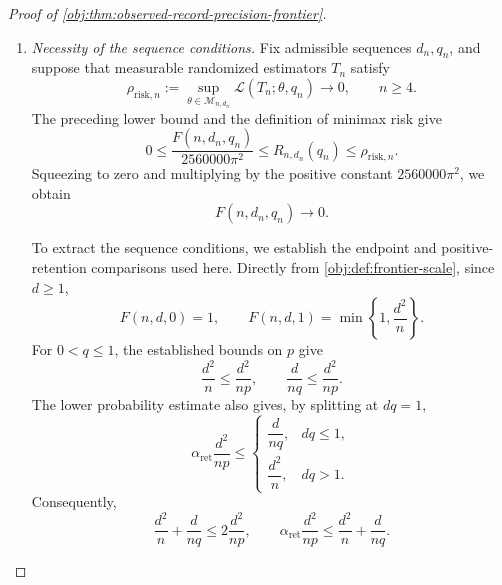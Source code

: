 \documentclass[11pt]{article}
\begin{document}
\begin{proof}[Proof of \cref{obj:thm:observed-record-precision-frontier}]
\begin{enumerate}
Take the opposite-sign priors of \cref{obj:def:block-prior} at amplitude \(h\).
By \cref{obj:lem:block-law}, they are supported almost surely in
\(\mathcal M_{n,d}\), with constant targets \(\pm\Delta\), where
\[
\Delta=\frac{mh}{n}>0.
\]
The record maps are jointly measurable: the partition and binary coordinates
are finite, and the outcomes depend affinely on the real baseline coordinates.
The block and amplitude conditions established above allow
\cref{obj:thm:block-testing-scale} to give
\[
\operatorname{TV}(P_{+1,h},P_{-1,h})\le\frac12.
\]
Applying \cref{obj:lem:full-record-two-prior-risk} therefore yields
\[
R_{n,d}(q)
\ge\frac{\Delta^2}{2}
       \bigl(1-\operatorname{TV}(P_{+1,h},P_{-1,h})\bigr)
\ge\frac{\Delta^2}{4}.
\]
Finally, \(m/n\ge1/4\) implies
\[
\frac{\kappa s}{4}
\le\frac{m\kappa s}{n}
=\Delta.
\]
Hence
\[
\begin{aligned}
\frac{F(n,d,q)}{2560000\pi^2}
&\le\frac{s^2}{2560000\pi^2}
\le\frac{s^2}{640000\pi^2}\\
&=\frac14\left(\frac{\kappa s}{4}\right)^2
\le\frac{\Delta^2}{4}
\le R_{n,d}(q).
\end{aligned}
\]
This proves the lower bound in both degree regimes, including \(q=0\).

\item \textit{Necessity of the sequence conditions.}
Fix admissible sequences \(d_n,q_n\), and suppose that measurable randomized
estimators \(T_n\) satisfy
\[
\rho_{\mathrm{risk},n}
:=
\sup_{\theta\in\mathcal M_{n,d_n}}
\mathcal L(T_n;\theta,q_n)
\longrightarrow0,
\qquad n\ge4.
\]
The preceding lower bound and the definition of minimax risk give
\[
0\le
\frac{F(n,d_n,q_n)}{2560000\pi^2}
\le R_{n,d_n}(q_n)
\le\rho_{\mathrm{risk},n}.
\]
Squeezing to zero and multiplying by the positive constant
\(2560000\pi^2\), we obtain
\[
F(n,d_n,q_n)\longrightarrow0.
\]

To extract the sequence conditions, we establish the endpoint and
positive-retention comparisons used here. Directly from
\cref{obj:def:frontier-scale}, since \(d\ge1\),
\[
F(n,d,0)=1,
\qquad
F(n,d,1)=\min\left\{1,\frac{d^2}{n}\right\}.
\]
For \(0<q\le1\), the established bounds on \(p\) give
\[
\frac{d^2}{n}\le\frac{d^2}{np},
\qquad
\frac{d}{nq}\le\frac{d^2}{np}.
\]
The lower probability estimate also gives, by splitting at \(dq=1\),
\[
\alpha_{\mathrm{ret}}\frac{d^2}{np}
\le
\begin{cases}
\dfrac{d}{nq},&dq\le1,\\[4pt]
\dfrac{d^2}{n},&dq>1.
\end{cases}
\]
Consequently,
\[
\frac{d^2}{n}+\frac{d}{nq}\le2\frac{d^2}{np},
\qquad
\alpha_{\mathrm{ret}}\frac{d^2}{np}
\le\frac{d^2}{n}+\frac{d}{nq}.
\]


\end{enumerate}
\end{proof}
\end{document}

